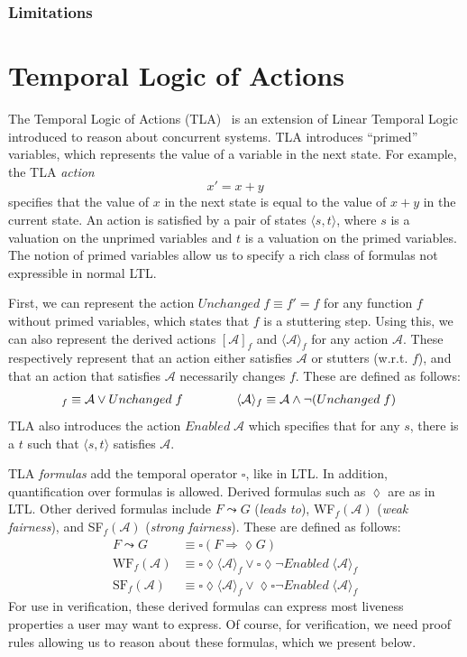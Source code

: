 \documentclass{llncs}
\begin{document}
\subsubsection{Limitations}
%
\section{Temporal Logic of Actions}\label{sec:tla}
The Temporal Logic of Actions (TLA)~\cite{tla-lamport} is an extension of Linear Temporal
Logic introduced to reason about concurrent systems. TLA introduces ``primed''
variables, which represents the value of a variable in the next state. For
example, the TLA \textit{action} $$x' = x + y$$ specifies that the value of $x$
in the next state is equal to the value of $x + y$ in the current state. An
action is satisfied by a pair of states $\langle s, t \rangle$, where $s$ is a
valuation on the unprimed variables and $t$ is a valuation on the primed
variables. The notion of primed variables allow us to specify a rich class of
formulas not expressible in normal LTL.

First, we can represent the action $Unchanged\;f \equiv f' = f$ for any 
function $f$  without primed variables, which states that $f$ is a
stuttering step. Using this, we can also represent the derived actions
$[\mathcal A]_f$ and $\langle \mathcal A \rangle_f$ for any action
$\mathcal A$. These respectively represent that an action either satisfies $\mathcal A$ or
stutters (w.r.t. $f$), and that an action that satisfies $\mathcal A$
necessarily changes $f$. These are defined as follows:
\begin{align*}
  [\mathcal A]_f \equiv \mathcal A \vee Unchanged\;f \hspace{1.5cm}
  & \langle \mathcal A \rangle_f \equiv \mathcal A \wedge \neg(Unchanged\;f)
\end{align*}
TLA also introduces the action $Enabled\;\mathcal A$ which specifies that for
any $s$, there is a $t$ such that $\langle s, t \rangle$ satisfies $\mathcal A$.

TLA \textit{formulas} add the temporal operator $\square$, like in LTL. In
addition, quantification over formulas is allowed. Derived formulas such as
$\lozenge$ are as in LTL. Other derived formulas include $F \leadsto G$
(\textit{leads to}), WF$_f(\mathcal A)$ (\textit{weak fairness}), and
SF$_f(\mathcal A)$ (\textit{strong fairness}). These are defined as follows:
\begin{align*}
  F \leadsto G &\equiv \square(F \Rightarrow \lozenge G) \\
  \text{WF}_f(\mathcal A) &\equiv \square\lozenge\langle\mathcal A\rangle_f \vee \square\lozenge\neg Enabled\;\langle\mathcal A\rangle_f \\
  \text{SF}_f(\mathcal A) &\equiv \square\lozenge\langle\mathcal A\rangle_f \vee \lozenge\square\neg Enabled\;\langle\mathcal A\rangle_f
\end{align*}
For use in verification, these derived formulas can express most liveness
properties a user may want to express. Of course, for verification, we need
proof rules allowing us to reason about these formulas, which we present below.
\end{document}
